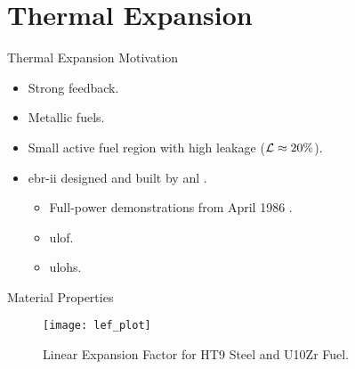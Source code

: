 \section{Thermal Expansion}
\label{sec:thermalExpansion}

\begin{frame}{Thermal Expansion Motivation}
  \begin{itemize}
    \item Strong feedback.
    \item Metallic fuels.
    \item Small active fuel region with high leakage ($\mathcal{L} \approx 20\%$).
    \item \gls{ebr-ii} designed and built by \gls{anl} \cite{PlentifulEnergy}.
      \begin{itemize}
        \item Full-power demonstrations from April 1986 \cite{ebriitests}.
        \item \gls{ulof}.
        \item \gls{ulohs}.
      \end{itemize}
  \end{itemize}
\end{frame}

\begin{frame}{Material Properties}
  \begin{figure}
    \centering
    \texttt{[image: lef\_plot]}
    \caption{Linear Expansion Factor for HT9 Steel and U10Zr Fuel.}
    \label{fig:lef_plot}
  \end{figure}
\end{frame}

